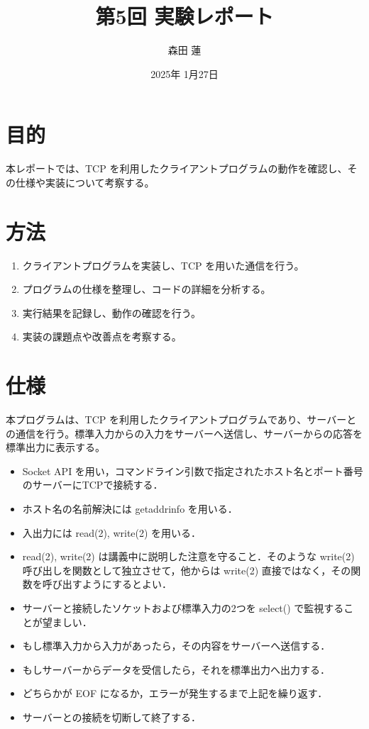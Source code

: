 \documentclass{jlreq}
\title{第5回 実験レポート}
\author{森田 蓮}
\date{2025年 1月27日}
\begin{document}
\maketitle

\section{目的}
本レポートでは、TCP を利用したクライアントプログラムの動作を確認し、その仕様や実装について考察する。

\section{方法}

\begin{enumerate}
    \item クライアントプログラムを実装し、TCP を用いた通信を行う。
    \item プログラムの仕様を整理し、コードの詳細を分析する。
    \item 実行結果を記録し、動作の確認を行う。
    \item 実装の課題点や改善点を考察する。
\end{enumerate}

\section{仕様}

本プログラムは、TCP を利用したクライアントプログラムであり、サーバーとの通信を行う。標準入力からの入力をサーバーへ送信し、サーバーからの応答を標準出力に表示する。

\begin{itemize}
    \item Socket API を用い，コマンドライン引数で指定されたホスト名とポート番号のサーバーにTCPで接続する．
    \item ホスト名の名前解決には getaddrinfo を用いる．
    \item 入出力には read(2), write(2) を用いる．
    \item read(2), write(2) は講義中に説明した注意を守ること．そのような write(2) 呼び出しを関数として独立させて，他からは write(2) 直接ではなく，その関数を呼び出すようにするとよい．
    \item サーバーと接続したソケットおよび標準入力の2つを select() で監視することが望ましい．
    \item もし標準入力から入力があったら，その内容をサーバーへ送信する．
    \item もしサーバーからデータを受信したら，それを標準出力へ出力する．
    \item どちらかが EOF になるか，エラーが発生するまで上記を繰り返す．
    \item サーバーとの接続を切断して終了する．
\end{itemize}
\end{document}
